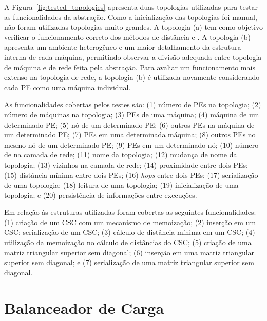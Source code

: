 A Figura~\ref{fig:tested_topologies} apresenta duas topologias utilizadas para testar as funcionalidades da abstração.
Como a inicialização das topologias foi manual, não foram utilizadas topologias muito grandes.
A topologia (a) tem como objetivo verificar o funcionamento correto dos métodos de distância e \hops.
A topologia (b) apresenta um ambiente heterogêneo e um maior detalhamento da estrutura interna de cada máquina, permitindo observar a divisão adequada entre topologia de máquina e de rede feita pela abstração.
Para avaliar um funcionamento mais extenso na topologia de rede, a topologia (b) é utilizada novamente considerando cada PE como uma máquina individual.

As funcionalidades cobertas pelos testes são: (1) número de PEs na topologia; (2) número de máquinas na topologia; (3) PEs de uma máquina; (4) máquina de um determinado PE; (5) nó de um determinado PE; (6) outros PEs na máquina de um determinado PE; (7) PEs em uma determinada máquina; (8) outros PEs no mesmo nó de um determinado PE; (9) PEs em um determinado nó; (10) número de \links na camada de rede; (11) nome da topologia; (12) mudança de nome da topologia; (13) vizinhos na camada de rede; (14) proximidade entre dois PEs; (15) distância mínima entre dois PEs; (16) \textit{hops} entre dois PEs; (17) serialização de uma topologia; (18) leitura de uma topologia; (19) inicialização de uma topologia; e (20) persistência de informações entre execuções.

Em relação às estruturas utilizadas foram cobertas as seguintes funcionalidades: (1) criação de um CSC com um mecanismo de memoização; (2) inserção em um CSC; serialização de um CSC; (3) cálculo de distância mínima em um CSC; (4) utilização da memoização no cálculo de distâncias do CSC; (5) criação de uma matriz triangular superior sem diagonal; (6) inserção em uma matriz triangular superior sem diagonal; e (7) serialização de uma matriz triangular superior sem diagonal.


\section{Balanceador de Carga}
\label{sec:my_lb}


